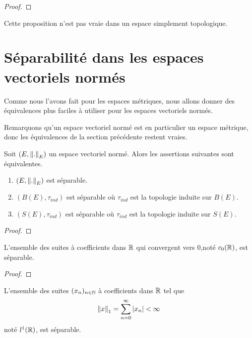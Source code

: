\ifdefined\outputproof
\begin{proof}

\end{proof}
\fi

\begin{remarque}
	Cette proposition n'est pas vraie dans un espace simplement topologique.
\end{remarque}

\section{Séparabilité dans les espaces vectoriels normés}

Comme nous l'avons fait pour les espaces métriques, nous allons donner des
équivalences plus faciles à utiliser pour les espaces vectoriels normés.

Remarquons qu'un espace vectoriel normé est en particulier un espace
métrique, donc les équivalences de la section précédente restent vraies.

\begin{proposition}
	Soit $(E, \norm{.}_{E})$ un espace vectoriel normé. Alors les
	assertions suivantes sont équivalentes.
	\begin{enumerate}
		\item $(E, \norm{.}_{E})$ est séparable.
		\item $(B(E), \tau_{ind})$ est séparable où $\tau_{ind}$ est la
			topologie induite sur $B(E)$.
		\item $(S(E), \tau_{ind})$ est séparable où $\tau_{ind}$ est la
			topologie induite sur $S(E)$.
	\end{enumerate}
\end{proposition}

\ifdefined\outputproof
\begin{proof}

\end{proof}
\fi

\begin{proposition}
	L'ensemble des suites à coefficients dans $\mathbb{R}$ qui convergent vers 0,noté
	$c_{0}(\mathbb{R})$, est séparable.
\end{proposition}

\ifdefined\outputproof
\begin{proof}

\end{proof}
\fi

\begin{proposition}
	L'ensemble des suites $(x_{n})_{n \in \mathbb{N}}$ à coefficients dans $\mathbb{R}$ tel que
	\begin{equation}
		\norm{x}_{1} = \displaystyle \sum_{n = 0}^{\infty} \abs{x_{n}} < \infty
	\end{equation}
	noté $l^{1}(\mathbb{R})$, est séparable.
\end{proposition}

